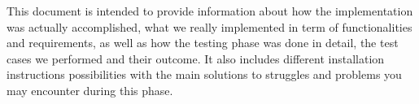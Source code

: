 This document is intended to provide information about how the implementation was actually accomplished, what we really implemented in term of functionalities and requirements, as well as how the testing phase was done in detail, the test cases we performed and their outcome. It also includes different installation instructions possibilities with the main solutions to struggles and problems you may encounter during this phase.